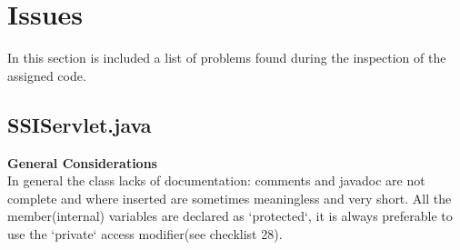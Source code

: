\documentclass[11pt,titlepage]{article} %
\begin{document}
\section{Issues}
In this section is included a list of problems found during the inspection of the assigned code.
\subsection{SSIServlet.java}
  \textbf{General Considerations} \hfill \\
  In general the class lacks of documentation: comments and javadoc are not complete and where inserted are sometimes meaningless and very short.\newline
  All the member(internal) variables are declared as `protected`, it is always preferable to use the `private` access modifier(see checklist 28). 
\end{document}
